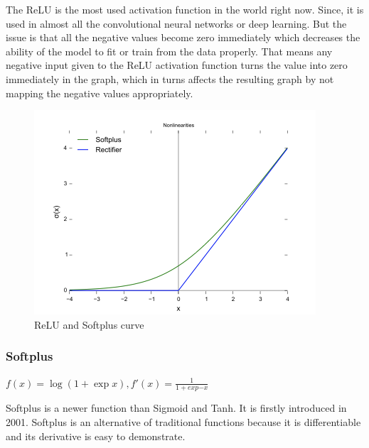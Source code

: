 \documentclass[11pt,a4paper]{article}
\begin{document}
The ReLU is the most used activation function in the world right now. Since, it is used in almost all the convolutional neural networks or deep learning. But the issue is that all the negative values become zero immediately which decreases the ability of the model to fit or train from the data properly. That means any negative input given to the ReLU activation function turns the value into zero immediately in the graph, which in turns affects the resulting graph by not mapping the negative values appropriately.
\begin{figure}[htb]
\begin{center}
\includegraphics[width=\columnwidth]{Rectifier_and_softplus_functions.png}
\end{center}
\caption{ReLU and Softplus curve }
\label{fig:figure4}
\end{figure}

\subsubsection{Softplus}
$f(x)= \log(1+\exp{x}), f'(x) = \frac{1}{1+exp{-x}}$

Softplus is a newer function than Sigmoid and Tanh. It is firstly introduced in 2001. Softplus is an alternative of traditional functions because it is differentiable and its derivative is easy to demonstrate.
\end{document}
